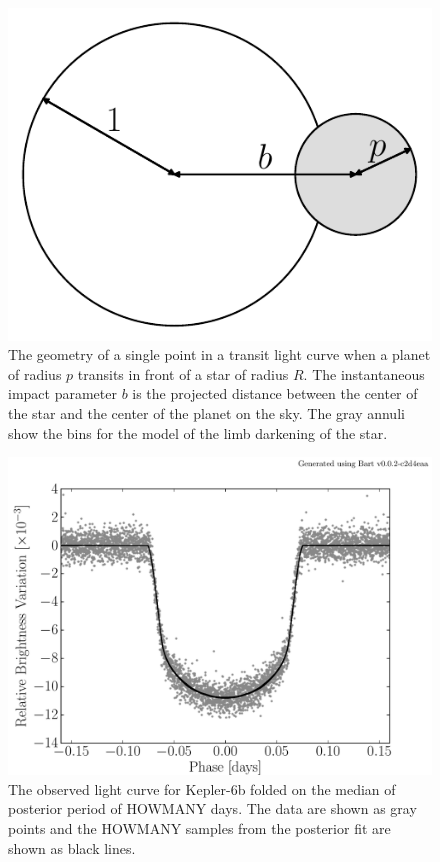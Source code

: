 \documentclass[12pt,preprint]{aastex}
\newcommand{\figlabel}[1]{\label{fig:#1}}
\begin{document}


\begin{figure}[htbp]
    \begin{center}
        \includegraphics[width=\textwidth]{figures/geom.pdf}
    \end{center}
    \caption{The geometry of a single point in a transit light curve when a
        planet of radius $p$ transits in front of a star of radius $R$. The
        instantaneous impact parameter $b$ is the projected distance between
        the center of the star and the center of the planet on the sky. The
        gray annuli show the bins for the model of the limb darkening of the
        star. \figlabel{geom}}
\end{figure}

\begin{figure}[htbp]
    \begin{center}
        \includegraphics[width=\textwidth]{figures/k6-lc.pdf}
    \end{center}
    \caption{The observed light curve for Kepler-6b folded on the median
        of posterior period of HOWMANY days. The data are shown as gray points
        and the HOWMANY samples from the posterior fit are shown as black
        lines. \figlabel{k6-lc}}
\end{figure}
\end{document}
